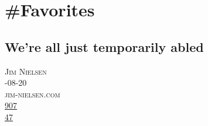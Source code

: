 \documentclass[10pt,a4paper]{article}
\begin{document}
\newpage
\section{\#Favorites}

\subsection{We’re all just temporarily abled}
\noindent\begin{minipage}[t]{0.20\linewidth}
\vspace{0pt}
\noindent\textsc{\footnotesize
{\scriptsize\faUser}\space 
Jim Nielsen \\
{\scriptsize\faCalendar}-08-20 \\
{\scriptsize\faGlobe}\space 
jim-nielsen.com \\
{\scriptsize\faThumbsOUp}\space 
\href{http://news.ycombinator.com/item?id=37205731\&utm\_term=comment}{907} \\
{\scriptsize\faComments}\space 
\href{http://news.ycombinator.com/item?id=37205731\&utm\_term=comment}{47} \\
}
\end{minipage} 
\end{document}
